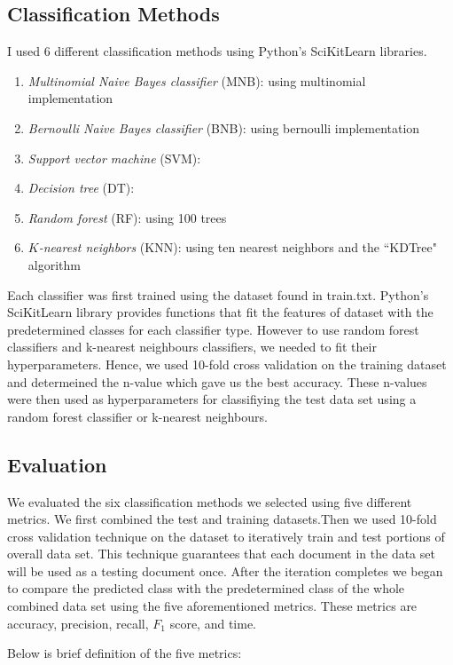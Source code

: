 \documentclass{article} %
\begin{document}
\subsection{Classification Methods}
I used 6 different classification methods using Python's SciKitLearn libraries.~\cite{scikit-learn}
\begin{enumerate}
\item \emph{Multinomial Naive Bayes classifier} (MNB): using multinomial implementation
\item \emph{Bernoulli Naive Bayes classifier} (BNB): using bernoulli implementation
\item \emph{Support vector machine} (SVM): 
\item \emph{Decision tree} (DT): 
\item \emph{Random forest} (RF): using 100 trees
\item \emph{$K$-nearest neighbors} (KNN): using ten nearest neighbors and the ``KDTree" algorithm
\end{enumerate}

Each classifier was first trained using the dataset found in train.txt. Python's SciKitLearn library provides functions that fit the features of dataset with the predetermined classes for each classifier type. However to use random forest classifiers and k-nearest neighbours classifiers, we needed to fit their hyperparameters. Hence, we used 10-fold cross validation on the training dataset  and determeined the n-value which gave us the best accuracy. These n-values were then used as hyperparameters for classifiying the test data set using a random forest classifier or k-nearest neighbours. 

\subsection{Evaluation}
We evaluated the six classification methods we selected using five different metrics. We first combined the test and training datasets.Then we used 10-fold cross validation technique on the dataset to iteratively train and test portions of overall data set. This technique guarantees that each document in the data set will be used as a testing document once. After the iteration completes we began to compare the predicted class with the predetermined class of the whole combined data set using the five aforementioned metrics. These metrics are accuracy, precision, recall, $F_1$ score, and time. 

Below is brief definition of the five metrics: 
\end{document}
